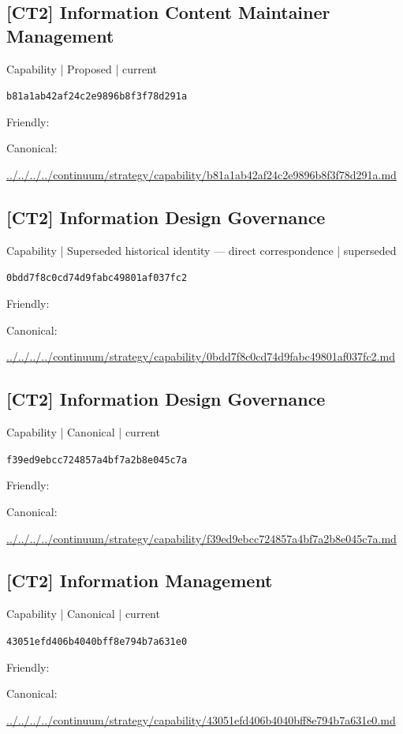 \documentclass[10pt,a4paper]{article}
\begin{document}
\subsection*{[CT2] Information Content Maintainer Management}
{\small Capability | Proposed | current}\par
\texttt{b81a1ab42af24c2e9896b8f3f78d291a}\par
Friendly: \par
Canonical: \par
{\footnotesize\url{../../../../continuum/strategy/capability/b81a1ab42af24c2e9896b8f3f78d291a.md}}\par
\subsection*{[CT2] Information Design Governance}
{\small Capability | Superseded historical identity — direct correspondence | superseded}\par
\texttt{0bdd7f8c0cd74d9fabc49801af037fc2}\par
Friendly: \par
Canonical: \par
{\footnotesize\url{../../../../continuum/strategy/capability/0bdd7f8c0cd74d9fabc49801af037fc2.md}}\par
\subsection*{[CT2] Information Design Governance}
{\small Capability | Canonical | current}\par
\texttt{f39ed9ebcc724857a4bf7a2b8e045c7a}\par
Friendly: \par
Canonical: \par
{\footnotesize\url{../../../../continuum/strategy/capability/f39ed9ebcc724857a4bf7a2b8e045c7a.md}}\par
\subsection*{[CT2] Information Management}
{\small Capability | Canonical | current}\par
\texttt{43051efd406b4040bff8e794b7a631e0}\par
Friendly: \par
Canonical: \par
{\footnotesize\url{../../../../continuum/strategy/capability/43051efd406b4040bff8e794b7a631e0.md}}\par
\end{document}

